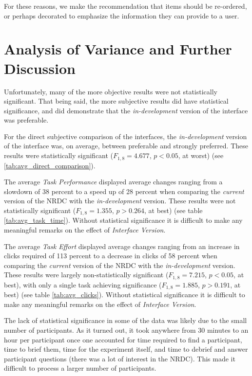 \documentclass{article}
\begin{document}
For these reasons, we make the recommendation that items should be re-ordered, or perhaps decorated to emphasize the information they can provide to a user.

%
%
\section{Analysis of Variance and Further Discussion}

Unfortunately, many of the more objective results were not statistically significant. That being said, the more subjective results did have statistical significance, and did demonstrate that the \emph{in-development} version of the interface was preferable.

For the direct subjective comparison of the interfaces, the \emph{in-development} version of the interface was, on average, between preferable and strongly preferred. These results were statistically significant ($F_{1,8} = 4.677$, $p < 0.05$, at worst) (see \ref{tab:avg_direct_comparison}).

The average \emph{Task Performance} displayed average changes ranging from a slowdown of 38 percent to a speed up of 28 percent when comparing the \emph{current} version of the NRDC with the \emph{in-development} version. These results were not statistically significant ($F_{1,8} = 1.355$, $p > 0.264$, at best) (see table \ref{tab:avg_task_time}). Without statistical significance it is difficult to make any meaningful remarks on the effect of \emph{Interface Version}.

The average \emph{Task Effort} displayed average changes ranging from an increase in clicks required of 113 percent to a decrease in clicks of 58 percent when comparing the \emph{current} version of the NRDC with the \emph{in-development} version. These results were largely non-statistically significant ($F_{1,8} = 7.215$, $p < 0.05$, at best), with only a single task achieving significance ($F_{1,8} = 1.885$, $p > 0.191$, at best) (see table \ref{tab:avg_clicks}). Without statistical significance it is difficult to make any meaningful remarks on the effect of \emph{Interface Version}.

The lack of statistical significance in some of the data was likely due to the small number of participants. As it turned out, it took anywhere from 30 minutes to an hour per participant once one accounted for time required to find a participant, time to brief them, time for the experiment itself, and time to debrief and answer participant questions (there was a lot of interest in the NRDC). This made it difficult to process a larger number of participants.
\end{document}
